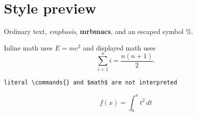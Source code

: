 \documentclass[11pt]{article}
\newcommand{\mrbmacs}{\textbf{mrbmacs}}
\begin{document}
\section{Style preview}
Ordinary text, \emph{emphasis}, \mrbmacs{}, and an escaped symbol \%.

Inline math uses $E = mc^2$ and displayed math uses
\[
  \sum_{i=1}^{n} i = \frac{n(n+1)}{2}.
\]

\begin{verbatim}
literal \commands{} and $math$ are not interpreted
\end{verbatim}

\begin{equation}
  f(x) = \int_0^x t^2\,dt
\end{equation}
\end{document}
